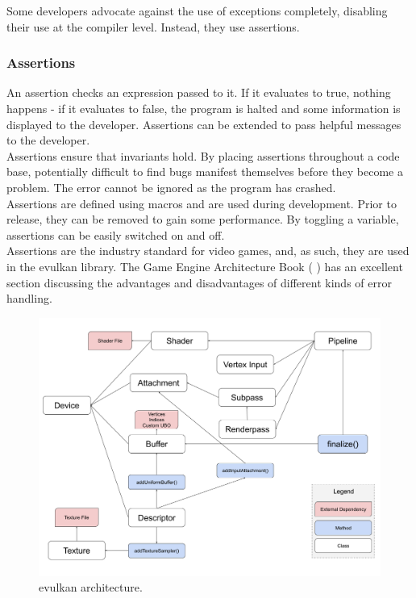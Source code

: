 \documentclass[12pt]{report}
\newcommand{\citebu}[1]{(\citenoparen{#1})}
\newcommand{\citenoparen}[1]{\citeauthor{#1} \citeyear{#1}}
\theoremstyle{definition}
\begin{document}
          Some developers advocate against the use of exceptions completely,
          disabling their use at the compiler level. Instead, they use
          assertions.

        \subsubsection{Assertions}

          An assertion checks an expression passed to it. If it evaluates to
          true, nothing happens - if it evaluates to false, the program is
          halted and some information is displayed to the developer.
          Assertions can be extended to pass helpful messages to the
          developer. \\

          Assertions ensure that invariants hold. By placing assertions
          throughout a code base, potentially difficult to find bugs manifest
          themselves before they become a problem. The error cannot be ignored
          as the program has crashed. \\

          Assertions are defined using macros and are used during development.
          Prior to release, they can be removed to gain some performance. By
          toggling a variable, assertions can be easily switched on and off. \\

          Assertions are the industry standard for video games, and, as such,
          they are used in the evulkan library. The Game Engine Architecture Book \citebu{gameEngineBook}
          has an excellent section discussing the advantages and disadvantages of
          different kinds of error handling.

        \begin{figure}[h]
          \centering
          \includegraphics[width=\textwidth]{images/evk_architecture.png}
          \caption{evulkan architecture.}
          \label{fig:evulkan_architecture}  
        \end{figure}
\end{document}
